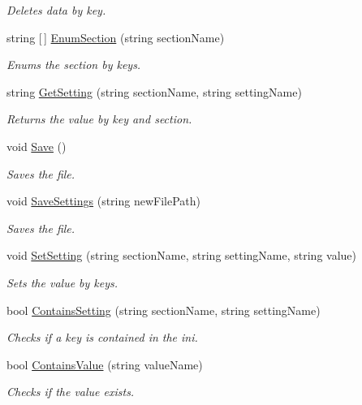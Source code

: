 \begin{DoxyCompactItemize}
\begin{DoxyCompactList}\small\item\em Deletes data by key. \end{DoxyCompactList}\item 
string \mbox{[}$\,$\mbox{]} \mbox{\hyperlink{class_o_e_invaders_1_1_library_1_1_ini_parser_a0d07d9af2cb34c65805965760f9da3b2}{Enum\+Section}} (string section\+Name)
\begin{DoxyCompactList}\small\item\em Enums the section by keys. \end{DoxyCompactList}\item 
string \mbox{\hyperlink{class_o_e_invaders_1_1_library_1_1_ini_parser_a3bd747ddffa89d0260d589ede0518b86}{Get\+Setting}} (string section\+Name, string setting\+Name)
\begin{DoxyCompactList}\small\item\em Returns the value by key and section. \end{DoxyCompactList}\item 
void \mbox{\hyperlink{class_o_e_invaders_1_1_library_1_1_ini_parser_abb76af2dd7efd7e4589709d2bc69ef95}{Save}} ()
\begin{DoxyCompactList}\small\item\em Saves the file. \end{DoxyCompactList}\item 
void \mbox{\hyperlink{class_o_e_invaders_1_1_library_1_1_ini_parser_a01c7ca35cc6323456ae7a0bff176ea81}{Save\+Settings}} (string new\+File\+Path)
\begin{DoxyCompactList}\small\item\em Saves the file. \end{DoxyCompactList}\item 
void \mbox{\hyperlink{class_o_e_invaders_1_1_library_1_1_ini_parser_a0cdddab162161355886b99215c8a0d51}{Set\+Setting}} (string section\+Name, string setting\+Name, string value)
\begin{DoxyCompactList}\small\item\em Sets the value by keys. \end{DoxyCompactList}\item 
bool \mbox{\hyperlink{class_o_e_invaders_1_1_library_1_1_ini_parser_a8a6f5e171cc729b9ffa3466fc4f11b6c}{Contains\+Setting}} (string section\+Name, string setting\+Name)
\begin{DoxyCompactList}\small\item\em Checks if a key is contained in the ini. \end{DoxyCompactList}\item 
bool \mbox{\hyperlink{class_o_e_invaders_1_1_library_1_1_ini_parser_a996aa6c597d52a5e3cbd40cef1e7b381}{Contains\+Value}} (string value\+Name)
\begin{DoxyCompactList}\small\item\em Checks if the value exists. \end{DoxyCompactList}\end{DoxyCompactItemize}
